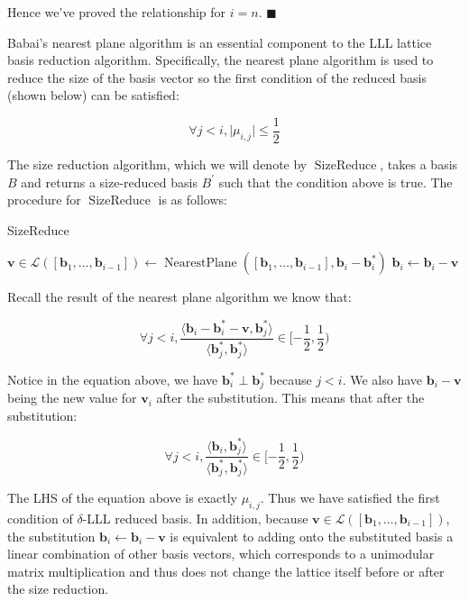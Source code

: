 Hence we've proved the relationship for $i = n$. $\blacksquare$

Babai's nearest plane algorithm is an essential component to the LLL lattice basis reduction algorithm. Specifically, the nearest plane algorithm is used to reduce the size of the basis vector so the first condition of the reduced basis (shown below) can be satisfied:

$$
\forall j<i, \vert\mu_{i, j}\vert \leq \frac{1}{2}
$$

The size reduction algorithm, which we will denote by $\operatorname{SizeReduce}$, takes a basis $B$ and returns a size-reduced basis $B^\prime$ such that the condition above is true. The procedure for $\operatorname{SizeReduce}$ is as follows:

\begin{algorithm}
\caption{SizeReduce}
\begin{algorithmic}[1]
        \State $\mathbf{v} \in \mathcal{L}([\mathbf{b}_1, \ldots, \mathbf{b}_{i-1}]) \leftarrow \operatorname{NearestPlane}([\mathbf{b}_1, \ldots, \mathbf{b}_{i-1}], \mathbf{b}_i - \mathbf{b}_i^\ast)$
        \State $\mathbf{b}_i \leftarrow \mathbf{b}_i - \mathbf{v}$
    \EndFor
\end{algorithmic}
\end{algorithm}

Recall the result of the nearest plane algorithm we know that:

$$
\forall j < i,
\frac{
    \langle
        \mathbf{b}_i - \mathbf{b}_i^\ast - \mathbf{v}, \mathbf{b}_j^\ast
    \rangle
}{
    \langle 
        \mathbf{b}_j^\ast, \mathbf{b}_j^\ast
    \rangle
} \in [-\frac{1}{2}, \frac{1}{2})
$$

Notice in the equation above, we have $\mathbf{b}_i^\ast \perp \mathbf{b}_j^\ast$ because $j < i$. We also have $\mathbf{b}_i - \mathbf{v}$ being the new value for $\mathbf{v}_i$ after the substitution. This means that after the substitution:

$$
\forall j < i,
\frac{
    \langle
        \mathbf{b}_i, \mathbf{b}_j^\ast
    \rangle
}{
    \langle
        \mathbf{b}_j^\ast, \mathbf{b}_j^\ast
    \rangle
} \in [-\frac{1}{2}, \frac{1}{2})
$$

The LHS of the equation above is exactly $\mu_{i,j}$. Thus we have satisfied the first condition of $\delta$-LLL reduced basis. In addition, because $\mathbf{v} \in \mathcal{L}([\mathbf{b}_1, \ldots, \mathbf{b}_{i-1}])$, the substitution $\mathbf{b}_i \leftarrow \mathbf{b}_i - \mathbf{v}$ is equivalent to adding onto the substituted basis a linear combination of other basis vectors, which corresponds to a unimodular matrix multiplication and thus does not change the lattice itself before or after the size reduction.

